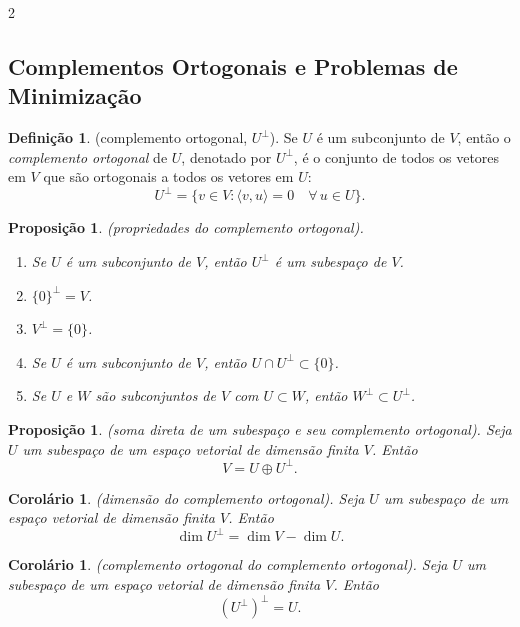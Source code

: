 \documentclass{article}
\theoremstyle{plain}
\newtheorem{prop}[thm]{Proposição}
\newtheorem{cor}[thm]{Corolário}
\theoremstyle{definition}
\newtheorem{defn}{Definição}[section]
\theoremstyle{remark}
\begin{document}
\begin{multicols}{2}
\subsection{Complementos Ortogonais e Problemas de Minimização}

\begin{defn} (complemento ortogonal, \(U^\perp\)).
    Se \(U\) é um subconjunto de \(V\), então o \emph{complemento ortogonal} de \(U\), denotado por \(U^\perp\), é o conjunto de todos os vetores em \(V\) que são ortogonais a todos os vetores em \(U\):
    \[
        U^\perp = \{v \in V : \langle v, u \rangle = 0 \quad \forall\,  u \in U\}.
    \]
\end{defn}

\begin{prop} (propriedades do complemento ortogonal).
    \begin{enumerate}
        \item [\textup{(a)}] Se \(U\) é um subconjunto de \(V\), então \(U^\perp\) é um subespaço de \(V\).
        \item [\textup{(b)}] \(\{0\}^\perp = V\).
        \item [\textup{(c)}] \(V^\perp = \{0\}\).
        \item [\textup{(d)}] Se \(U\) é um subconjunto de \(V\), então \(U \cap U^\perp \subset \{0\}\).
        \item [\textup{(e)}] Se \(U\) e \(W\) são subconjuntos de \(V\) com \(U \subset W\), então \(W^\perp \subset U^\perp\).
    \end{enumerate}
\end{prop}

\begin{prop} (soma direta de um subespaço e seu complemento ortogonal).
    Seja \(U\) um subespaço de um espaço vetorial de dimensão finita \(V\). Então
    \[
        V = U \oplus U^\perp.
    \]
\end{prop}

\begin{cor} (dimensão do complemento ortogonal).
    Seja \(U\) um subespaço de um espaço vetorial de dimensão finita \(V\). Então
    \[
        \dim U^\perp = \dim V - \dim U.
    \]
\end{cor}

\begin{cor} (complemento ortogonal do complemento ortogonal).
    Seja \(U\) um subespaço de um espaço vetorial de dimensão finita \(V\). Então
    \[
        (U^\perp)^\perp = U.
    \]
\end{cor}


\end{multicols}
\end{document}
